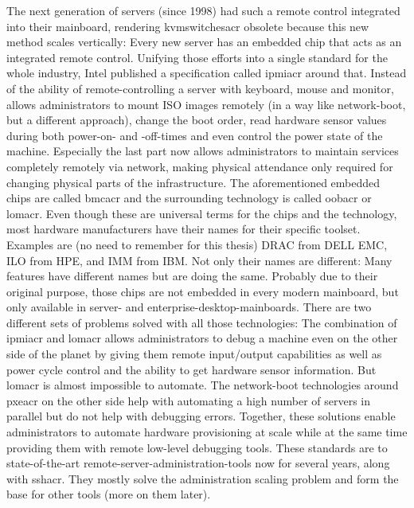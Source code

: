 The next generation of servers (since 1998) had such a remote control integrated into their mainboard, rendering \gls{kvmswitchesacr} obsolete because this new method scales vertically: Every new server has an embedded chip that acts as an integrated remote control. Unifying those efforts into a single standard for the whole industry, Intel published a specification called \gls{ipmiacr} around that. Instead of  the ability of remote-controlling a server with keyboard, mouse and monitor,  allows administrators to mount ISO images remotely (in a way like network-boot, but a different approach), change the boot order, read hardware sensor values during both power-on- and -off-times and even control the power state of the machine. Especially the last part now allows administrators to maintain services completely remotely via network, making physical attendance only required for changing physical parts of the infrastructure. The aforementioned embedded chips are called \gls{bmcacr} and the surrounding technology is called \gls{oobacr} or \gls{lomacr}. Even though these are universal terms for the chips and the technology, most hardware manufacturers have their names for their specific toolset. Examples are (no need to remember for this thesis) DRAC from DELL EMC, ILO from HPE, and IMM from IBM. Not only their names are different: Many features have different names but are doing the same. Probably due to their original purpose, those chips are not embedded in every modern mainboard, but only available in server- and enterprise-desktop-mainboards.
\newline
There are two different sets of problems solved with all those technologies:
The combination of \gls{ipmiacr} and \gls{lomacr} allows administrators to debug a machine even on the other side of the planet by giving them remote input/output capabilities as well as power cycle control and the ability to get hardware sensor information. But \gls{lomacr} is almost impossible to automate. %
The network-boot technologies around \gls{pxeacr} on the other side help with automating a high number of servers in parallel but do not help with debugging errors.
\newline
Together, these solutions enable administrators to automate hardware provisioning at scale while at the same time providing them with remote low-level debugging tools.
\newline
These standards are to state-of-the-art remote-server-administration-tools now for several years, along with \gls{sshacr}. They mostly solve the administration scaling problem and form the base for other tools (more on them later). %
